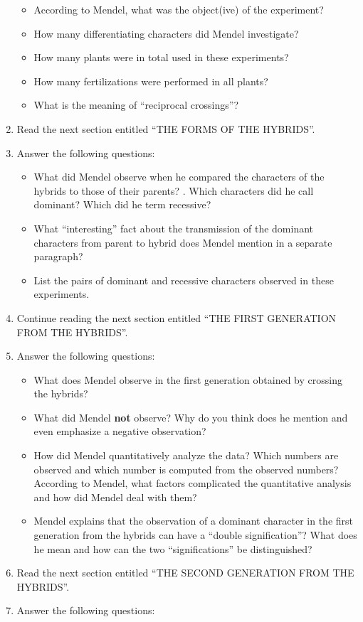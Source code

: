 \documentclass[]{book}
\providecommand{\tightlist}{%
  \setlength{\itemsep}{0pt}\setlength{\parskip}{0pt}}
\begin{document}
\begin{enumerate}
  \begin{itemize}
  \tightlist
  \item
    According to Mendel, what was the object(ive) of the experiment?
  \item
    How many differentiating characters did Mendel investigate?
  \item
    How many plants were in total used in these experiments?
  \item
    How many fertilizations were performed in all plants?
  \item
    What is the meaning of ``reciprocal crossings''?
  \end{itemize}
\item
  Read the next section entitled ``THE FORMS OF THE HYBRIDS''.
\item
  Answer the following questions:

  \begin{itemize}
  \tightlist
  \item
    What did Mendel observe when he compared the characters of the
    hybrids to those of their parents? . Which characters did he call
    dominant? Which did he term recessive?
  \item
    What ``interesting'' fact about the transmission of the dominant
    characters from parent to hybrid does Mendel mention in a separate
    paragraph?
  \item
    List the pairs of dominant and recessive characters observed in
    these experiments.
  \end{itemize}
\item
  Continue reading the next section entitled ``THE FIRST GENERATION FROM
  THE HYBRIDS''.
\item
  Answer the following questions:

  \begin{itemize}
  \tightlist
  \item
    What does Mendel observe in the first generation obtained by
    crossing the hybrids?
  \item
    What did Mendel \textbf{not} observe? Why do you think does he
    mention and even emphasize a negative observation?
  \item
    How did Mendel quantitatively analyze the data? Which numbers are
    observed and which number is computed from the observed numbers?
    According to Mendel, what factors complicated the quantitative
    analysis and how did Mendel deal with them?
  \item
    Mendel explains that the observation of a dominant character in the
    first generation from the hybrids can have a ``double
    signification''? What does he mean and how can the two
    ``significations'' be distinguished?
  \end{itemize}
\item
  Read the next section entitled ``THE SECOND GENERATION FROM THE
  HYBRIDS''.
\item
  Answer the following questions:


\end{enumerate}
\end{document}
